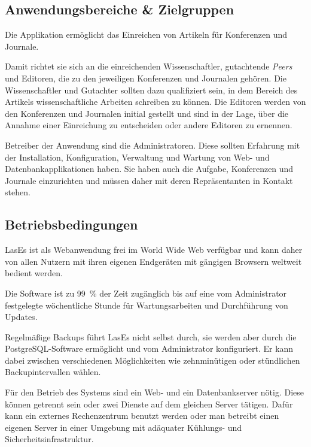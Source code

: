
\subsection{Anwendungsbereiche \& Zielgruppen}

Die Applikation ermöglicht das Einreichen von Artikeln für Konferenzen und Journale.

Damit richtet sie sich an die einreichenden Wissenschaftler, gutachtende \emph{Peers} und Editoren, die zu den jeweiligen Konferenzen und Journalen gehören.
Die Wissenschaftler und Gutachter sollten dazu qualifiziert sein, in dem Bereich des Artikels wissenschaftliche Arbeiten schreiben zu können.
Die Editoren werden von den Konferenzen und Journalen initial gestellt und sind in der Lage, über die Annahme einer Einreichung zu entscheiden oder andere Editoren zu ernennen.

Betreiber der Anwendung sind die Administratoren.
Diese sollten Erfahrung mit der Installation, Konfiguration, Verwaltung und Wartung von Web- und Datenbankapplikationen haben.
Sie haben auch die Aufgabe, Konferenzen und Journale einzurichten und müssen daher mit deren Repräsentanten in Kontakt stehen.

\subsection{Betriebsbedingungen}

LasEs ist als Webanwendung frei im World Wide Web verfügbar und kann daher von allen Nutzern mit ihren eigenen Endgeräten mit gängigen Browsern weltweit bedient werden.

Die Software ist zu 99~\% der Zeit zugänglich bis auf eine vom Administrator festgelegte wöchentliche Stunde für Wartungsarbeiten und Durchführung von Updates.

Regelmäßige Backups führt LasEs nicht selbst durch, sie werden aber durch die PostgreSQL-Software ermöglicht und vom Administrator konfiguriert.
Er kann dabei zwischen verschiedenen Möglichkeiten wie zehnminütigen oder stündlichen Backupintervallen wählen.

Für den Betrieb des Systems sind ein Web- und ein Datenbankserver nötig.
Diese können getrennt sein oder zwei Dienste auf dem gleichen Server tätigen.
Dafür kann ein externes Rechenzentrum benutzt werden oder man betreibt einen eigenen Server in einer Umgebung mit adäquater Kühlungs- und Sicherheitsinfrastruktur.